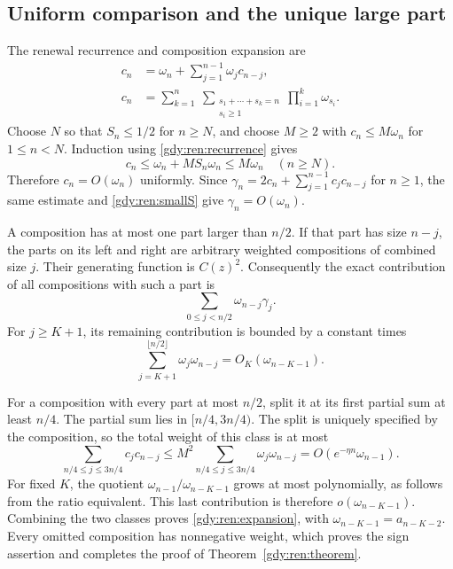 \documentclass[11pt]{article}
\numberwithin{equation}{section}
\theoremstyle{definition}
\theoremstyle{remark}
\begin{document}
\subsection{Uniform comparison and the unique large part}
The renewal recurrence and composition expansion are
\begin{align}
 c_n&=\omega_n+\sum_{j=1}^{n-1}\omega_jc_{n-j},\label{gdy:ren:recurrence}\\
 c_n&=\sum_{k=1}^{n}\ \sum_{\substack{s_1+\cdots+s_k=n\\s_i\ge1}}
                   \prod_{i=1}^{k}\omega_{s_i}.\label{gdy:ren:compositions}
\end{align}
Choose $N$ so that $S_n\le1/2$ for $n\ge N$, and choose $M\ge2$
with $c_n\le M\omega_n$ for $1\le n<N$. Induction using
\eqref{gdy:ren:recurrence} gives
\[
 c_n\le \omega_n+MS_n\omega_n\le M\omega_n\quad(n\ge N).
\]
Therefore $c_n=O(\omega_n)$ uniformly. Since
$\gamma_n=2c_n+\sum_{j=1}^{n-1}c_jc_{n-j}$ for $n\ge1$, the same estimate
and \eqref{gdy:ren:smallS} give $\gamma_n=O(\omega_n)$.

A composition has at most one part larger than $n/2$. If that part has
size $n-j$, the parts on its left and right are arbitrary weighted
compositions of combined size $j$. Their generating function is $C(z)^2$.
Consequently the exact contribution of all compositions with such a part is
\begin{equation}\label{gdy:ren:giant}
 \sum_{0\le j<n/2}\omega_{n-j}\gamma_j.
\end{equation}
For $j\ge K+1$, its remaining contribution is bounded by a constant times
\[
 \sum_{j=K+1}^{\lfloor n/2\rfloor}\omega_j\omega_{n-j}
       =O_K(\omega_{n-K-1}).
\]

For a composition with every part at most $n/2$, split it at its first
partial sum at least $n/4$. The partial sum lies in $[n/4,3n/4)$.
The split is uniquely specified by the composition, so the total weight
of this class is at most
\[
 \sum_{n/4\le j\le3n/4}c_jc_{n-j}
 \le M^2\sum_{n/4\le j\le3n/4}\omega_j\omega_{n-j}
 =O(e^{-\eta n}\omega_{n-1}).
\]
For fixed $K$, the quotient $\omega_{n-1}/\omega_{n-K-1}$ grows at most
polynomially, as follows from the ratio equivalent. This last contribution
is therefore $o(\omega_{n-K-1})$. Combining the two classes proves
\eqref{gdy:ren:expansion}, with $\omega_{n-K-1}=a_{n-K-2}$.
Every omitted composition has nonnegative weight, which proves the
sign assertion and completes the proof of Theorem~\ref{gdy:ren:theorem}.
\end{document}
